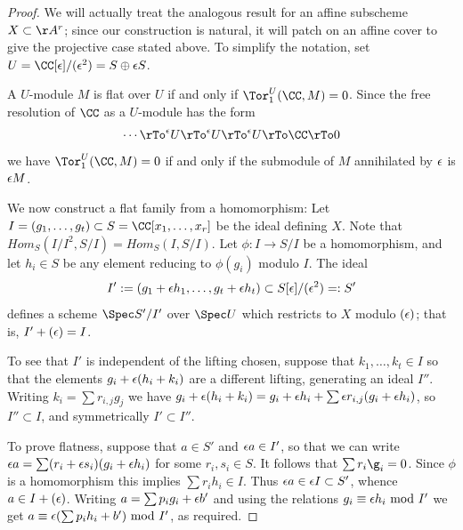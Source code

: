 \begin{proof}
We will actually treat the analogous result for an affine subscheme $X \subset \AA^r$; since our construction is natural, it will patch on an affine cover to give the projective case stated above. To simplify the notation, set $U = \CC[\eps]/(\eps^2)= S \oplus \eps S$. 

A $U$-module $M$ is flat  over $U$ if and only if $\Tor_1^U(\CC,M) = 0$. 
Since the free resolution of $\CC$ as a $U$-module has the form
$$
\cdots \rTo^\eps U \rTo^\eps U \rTo^\eps U \rTo \CC \rTo 0
$$
we have $\Tor_1^U(\CC,M)=0$ if and only if the submodule of $M$ annihilated by $\eps$ is $\eps M$.


We now construct a flat family from a homomorphism: Let $I = (g_1,\dots, g_t)\subset S = \CC[x_1,\dots, x_r]$ be the ideal defining $X$. 
Note that $Hom_S(I/I^2, S/I) = Hom_S(I,S/I)$. Let $\phi: I\to S/I$ be a homomorphism, and let $h_i\in S$ be
any element reducing to $\phi(g_i)$ modulo $I$.  The ideal
$$
I' := (g_1+\eps h_1,\dots, g_t+\eps h_t)\subset S[\eps]/(\eps^2) =: S'
$$
defines a scheme $\Spec S'/I'$  over $\Spec U$ which restricts to $X$ modulo $(\eps)$; that is, $I' +(\eps) = I$. 

To see that $I'$ is 
independent of the lifting chosen, suppose that $k_1,\dots,k_t\in I$ so that the elements $g_i+\eps(h_i+k_i)$ are a different lifting,
generating an ideal $I''$.
Writing $k_i = \sum r_{i,j}g_j$ we have $g_i+\eps(h_i+k_i) = g_i+\eps h_i+ \sum \eps r_{i,j}(g_i+\eps h_i)$, so 
$I'' \subset I$, and symmetrically $I' \subset I''$.

To prove flatness, suppose that $a\in S'$ and  $\eps a  \in I'$,
so that we can write  $\eps a= \sum(r_i+\eps s_i)(g_i+\eps h_i)$ for some $r_{i}, s_{i} \in S$.
It follows that 
$\sum r_i\g_i = 0$. Since $\phi$ is a homomorphism this implies $\sum r_i h_i \in I.$ Thus
$\eps a \in  \eps I\subset S'$, whence $a\in I + (\eps)$.  Writing $a =\sum p_i g_i+\eps b'$
and using the relations $g_i \equiv \eps h_i \hbox{ mod } I'$ we get
 $a \equiv \eps (\sum p_i h_i+b') \hbox{ mod } I'$, as required.


\end{proof}
